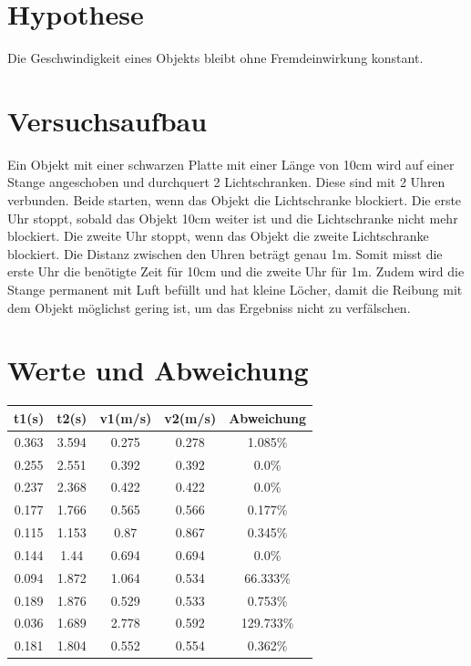 \documentclass[8pt, letterpaper]{article}
\begin{document}

\section{Hypothese}
Die Geschwindigkeit eines Objekts bleibt ohne Fremdeinwirkung konstant.

\section{Versuchsaufbau}
Ein Objekt mit einer schwarzen Platte mit einer Länge von 10cm wird auf einer Stange angeschoben und durchquert 2 Lichtschranken. Diese sind mit 2 Uhren verbunden. Beide starten, wenn das Objekt die Lichtschranke blockiert. Die erste Uhr stoppt, sobald das Objekt 10cm weiter ist und die Lichtschranke nicht mehr blockiert. Die zweite Uhr stoppt, wenn das Objekt die zweite Lichtschranke blockiert. Die Distanz zwischen den Uhren beträgt genau 1m. Somit misst die erste Uhr die benötigte Zeit für 10cm und die zweite Uhr für 1m. Zudem wird die Stange permanent mit Luft befüllt und hat kleine Löcher, damit die Reibung mit dem Objekt möglichst gering ist, um das Ergebniss nicht zu verfälschen.

\section{Werte und Abweichung}

\begin{center}
  \begin{tabular} { c|c|c|c|c }
    t1(s) & t2(s) & v1(m/s) & v2(m/s) & Abweichung \\
    \hline
    0.363 & 3.594 & 0.275 & 0.278 & 1.085\% \\
    0.255 & 2.551 & 0.392 & 0.392 & 0.0\% \\
    0.237 & 2.368 & 0.422 & 0.422 & 0.0\% \\
    0.177 & 1.766 & 0.565 & 0.566 & 0.177\% \\
    0.115 & 1.153 & 0.87 & 0.867 & 0.345\% \\
    0.144 & 1.44 & 0.694 & 0.694 & 0.0\% \\
    0.094 & 1.872 & 1.064 & 0.534 & 66.333\% \\
    0.189 & 1.876 & 0.529 & 0.533 & 0.753\% \\
    0.036 & 1.689 & 2.778 & 0.592 & 129.733\% \\
    0.181 & 1.804 & 0.552 & 0.554 & 0.362\%
  \end{tabular}
\end{center}
\end{document}
